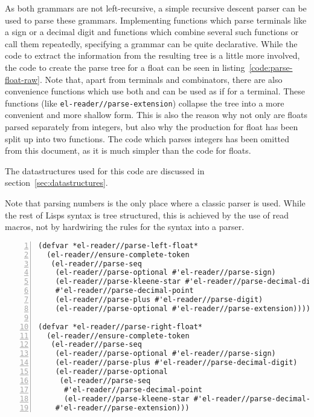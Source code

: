 \documentclass[a4paper,10pt,twoside]{report}
\newcommand{\fun}[1]{\texttt{#1}}
\begin{document}
As both grammars are not left-recursive, a simple recursive descent parser can
be used to parse these grammars.  Implementing functions which parse terminals
like a sign or a decimal digit and functions which combine several such
functions or call them repeatedly, specifying a grammar can be quite
declarative.  While the code to extract the information from the resulting tree
is a little more involved, the code to create the parse tree for a float can be
seen in listing~\ref{code:parse-float-raw}.  Note that, apart from terminals and
combinators, there are also convenience functions which use both and can be used
as if for a terminal.  These functions (like \fun{el-reader//parse-extension})
collapse the tree into a more convenient and more shallow form.  This is also
the reason why not only are floats parsed separately from integers, but also why
the production for float has been split up into two functions.  The code which
parses integers has been omitted from this document, as it is much simpler than
the code for floats.

The datastructures used for this code are discussed in
section~\ref{sec:datastructures}.

Note that parsing numbers is the only place where a classic parser is used.
While the rest of Lisps syntax is tree structured, this is achieved by the use
of read macros, not by hardwiring the rules for the syntax into a parser.

\pagebreak

\begin{lstlisting}[style=lispcode,label={code:parse-float-raw},caption={Create a
  function which parses a float into a tree.},numbers=left]
(defvar *el-reader//parse-left-float*
  (el-reader//ensure-complete-token
   (el-reader//parse-seq
    (el-reader//parse-optional #'el-reader//parse-sign)
    (el-reader//parse-kleene-star #'el-reader//parse-decimal-digit)
    #'el-reader//parse-decimal-point
    (el-reader//parse-plus #'el-reader//parse-digit)
    (el-reader//parse-optional #'el-reader//parse-extension))))

(defvar *el-reader//parse-right-float*
  (el-reader//ensure-complete-token
   (el-reader//parse-seq
    (el-reader//parse-optional #'el-reader//parse-sign)
    (el-reader//parse-plus #'el-reader//parse-decimal-digit)
    (el-reader//parse-optional
     (el-reader//parse-seq
      #'el-reader//parse-decimal-point
      (el-reader//parse-kleene-star #'el-reader//parse-decimal-digit)))
    #'el-reader//parse-extension)))
\end{lstlisting}
\end{document}
